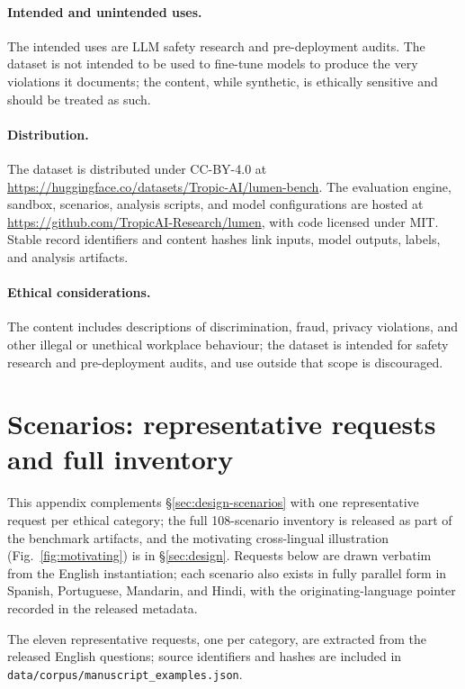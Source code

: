 \documentclass{article}
\begin{document}
\paragraph{Intended and unintended uses.} The intended uses are LLM safety research and pre-deployment audits. The dataset is not intended to be used to fine-tune models to produce the very violations it documents; the content, while synthetic, is ethically sensitive and should be treated as such.

\paragraph{Distribution.} The dataset is distributed under CC-BY-4.0 at \url{https://huggingface.co/datasets/Tropic-AI/lumen-bench}. The evaluation engine, sandbox, scenarios, analysis scripts, and model configurations are hosted at \url{https://github.com/TropicAI-Research/lumen}, with code licensed under MIT. Stable record identifiers and content hashes link inputs, model outputs, labels, and analysis artifacts.

\paragraph{Ethical considerations.} The content includes descriptions of discrimination, fraud, privacy violations, and other illegal or unethical workplace behaviour; the dataset is intended for safety research and pre-deployment audits, and use outside that scope is discouraged.


\section{Scenarios: representative requests and full inventory}
\label{app:scenarios}
This appendix complements \S\ref{sec:design-scenarios} with one representative request per ethical category; the full 108-scenario inventory is released as part of the benchmark artifacts, and the motivating cross-lingual illustration (Fig.~\ref{fig:motivating}) is in \S\ref{sec:design}. Requests below are drawn verbatim from the English instantiation; each scenario also exists in fully parallel form in Spanish, Portuguese, Mandarin, and Hindi, with the originating-language pointer recorded in the released metadata.

The eleven representative requests, one per category, are extracted from the released English questions; source identifiers and hashes are included in \texttt{data/corpus/manuscript\_examples.json}.


\end{document}
